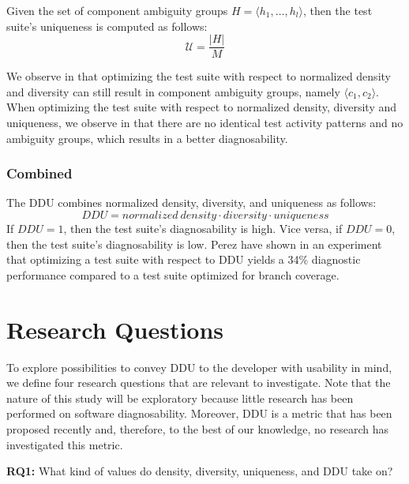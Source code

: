 \documentclass[twoside,a4paper,11pt]{memoir}
\begin{document}
Given the set of component ambiguity groups $H = \langle h_1, \dots, h_l \rangle$, then the test suite's uniqueness is computed as follows:
\begin{equation}
  \label{eq:uniqueness}
  \mathcal{U} = \frac{|H|}{M}
\end{equation}

We observe in  that optimizing the test suite with respect to normalized density and diversity can still result in component ambiguity groups, namely $\langle c_1, c_2 \rangle$.
When optimizing the test suite with respect to normalized density, diversity and uniqueness, we observe in  that there are no identical test activity patterns and no ambiguity groups, which results in a better diagnosability.

\subsection{Combined}
The DDU combines normalized density, diversity, and uniqueness as follows:
\begin{equation}
 DDU = normalized\ density \cdot diversity \cdot uniqueness
\end{equation}
If $DDU = 1$, then the test suite's diagnosability is high.
Vice versa, if $DDU = 0$, then the test suite's diagnosability is low.
Perez \etal \cite{DBLP:conf/icse/PerezAD17} have shown in an experiment that optimizing a test suite with respect to DDU yields a 34\% diagnostic performance compared to a test suite optimized for branch coverage.



\chapter{Research Questions}
\label{ch:research_questions}
To explore possibilities to convey DDU to the developer with usability in mind, we define four research questions that are relevant to investigate.
Note that the nature of this study will be exploratory because little research has been performed on software diagnosability.
Moreover, DDU is a metric that has been proposed recently \cite{DBLP:conf/icse/PerezAD17} and, therefore, to the best of our knowledge, no research has investigated this metric.

\begin{framed}
\noindent
\textbf{RQ1:} What kind of values do density, diversity, uniqueness, and DDU take on?
\end{framed}
\end{document}

